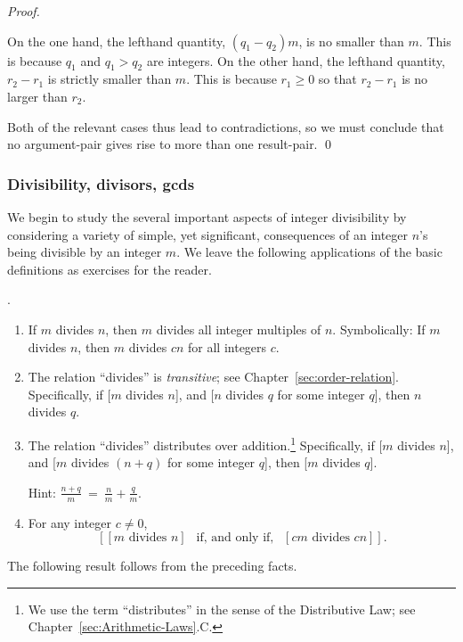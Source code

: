 \begin{proof}
\begin{itemize}
On the one hand, the lefthand quantity, $(q_1 - q_2) m$, is no smaller
than $m$.  This is because $q_1$ and $q_1 > q_2$ are integers.  On the
other hand, the lefthand quantity, $r_2 - r_1$ is strictly smaller
than $m$.  This is because $r_1 \geq 0$ so that $r_2 - r_1$ is no
larger than $r_2$.
\end{itemize}
Both of the relevant cases thus lead to contradictions, so we must
conclude that no argument-pair gives rise to more than one
result-pair.  \qed
\end{proof}


\subsubsection{Divisibility, divisors, {\sc gcd}s}
\label{sec:divisibility+GCD}

We begin to study the several important aspects of integer
divisibility by considering a variety of simple, yet significant,
consequences of an integer $n$'s being divisible by an integer $m$.
We leave the following applications of the basic definitions as
exercises for the reader.

\begin{prop}.
\label{thm:basic-divisibility}

\begin{enumerate}
\item
If $m$ divides $n$, then $m$ divides all integer multiples of $n$.
Symbolically: If $m$ divides $n$, then $m$ divides $cn$ for all
integers $c$.
\item
The relation ``divides'' is {\em transitive}; see
Chapter~\ref{sec:order-relation}.  Specifically, if [$m$ divides $n$],
and [$n$ divides $q$ for some integer $q$], then $n$ divides $q$.
\item
The relation ``divides'' distributes over addition.\footnote{We use
  the term ``distributes'' in the sense of the Distributive Law; see
  Chapter~\ref{sec:Arithmetic-Laws}.C.}  Specifically, if [$m$ divides
  $n$], and [$m$ divides $(n+q)$ for some integer $q$], then [$m$
  divides $q$].

Hint: $\displaystyle \frac{n+q}{m} \ = \ \frac{n}{m} + \frac{q}{m}$.
\item 
For any integer $c \neq 0$,
\[ \left[[m \mbox{ divides } n] \ \ \mbox{ if, and only if, } \ \ [cm
    \mbox{ divides } cn] \right]. \]
\end{enumerate}
\end{prop}

The following result follows from the preceding facts.

